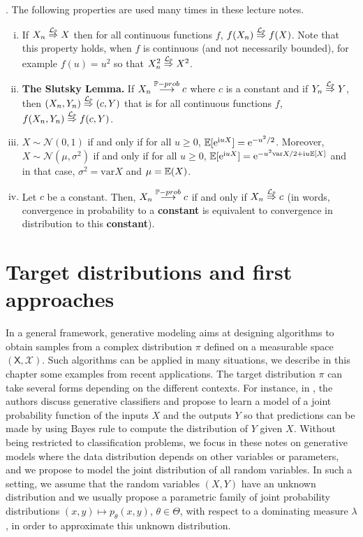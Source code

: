 \documentclass[english,graybox,envcountchap,envcountsame,sectrefs,shortlabels]{svmono}
\theoremstyle{style}
\newcommand{\weaklim}{\ensuremath{\stackrel{\mathcal{L}_{\PP}}{\Rightarrow}}}
\newcommand{\rme}{\mathrm{e}}
\newcommand{\rmi}{\mathrm{i}}
\newcommand{\plim}[1]{\stackrel{#1-prob}{\longrightarrow}}
\newcommand{\gauss}{\mathcal{N}}
\begin{document}
.
\newcommand{\var}{\mathrm{var}}
The following properties are used many times in these lecture notes.
\begin{enumerate}[(i)]
\item If $X_n \weaklim X$ then for all continuous functions $f$, $f(X_n) \weaklim f(X)$. Note that this property  holds, when $f$ is continuous (and not necessarily bounded), for example $f(u)=u^2$ so that $X_n^2 \weaklim X^2$.
\item \textbf{The Slutsky Lemma.} If $X_n \plim{\PP} c$ where $c$ is a constant and if $Y_n \weaklim Y$, then $(X_n,Y_n) \weaklim (c,Y)$ that is for all continuous functions $f$, $f(X_n,Y_n) \weaklim f(c,Y)$.
\item $X \sim \gauss(0,1)$ if and only if for all $u \geq 0$, $\PE[\rme^{\rmi u
    X}]=\rme^{-u^2/2}$. Moreover, $X \sim \gauss(\mu,\sigma^2)$ if and only if
  for all $u \geq 0$, $\PE[\rme^{\rmi u X}]=\rme^{-u^2 \var{X}/2+\rmi
    u \PE[X]}$ and in that case, $\sigma^2=\var{X}$ and $\mu=\mathbb{E}(X)$.
 \item Let $c$ be a constant. Then, $X_n \plim{\PP} c$ if and only if $X_n \weaklim c$ (in words, convergence
   in probability to a {\bf constant} is equivalent to convergence in
   distribution to this {\bf constant}).
\end{enumerate}



\dominitoc
\tableofcontents

\chapter{Target distributions and first approaches}
In a general framework, generative modeling aims at designing algorithms to obtain samples from a complex distribution $\pi$ defined on a measurable space $(\mathsf{X},\mathcal{X})$. Such algorithms can be applied in many situations, we describe in this chapter some examples from recent applications. The target distribution $\pi$ can take several forms depending on the different contexts.
 For instance, in \cite{ng2001discriminative}, the authors discuss generative classifiers and propose to learn a model of a joint probability function of the inputs $X$ and the outputs $Y$ so that predictions can be made by using Bayes rule to compute the distribution of $Y$ given $X$. Without being restricted to classification problems, we focus in these notes on generative models where the data distribution depends on other variables or parameters, and we propose to model the joint distribution of all random variables. In such a setting, we assume that the random variables $(X,Y)$ have an unknown distribution and we usually propose a parametric family of joint probability distributions $(x,y)\mapsto p_\theta(x,y)$, $\theta\in\Theta$, with respect to a dominating measure $\lambda$, in order to approximate this unknown distribution. 
\end{document}
